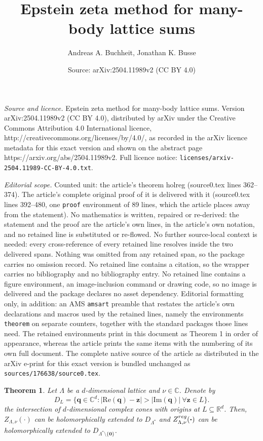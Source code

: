 \documentclass[10pt,a4paper]{amsart}
\title{Epstein zeta method for many-body lattice sums}
\author{Andreas A. Buchheit, Jonathan K. Busse}
\date{Source: arXiv:2504.11989v2 (CC BY 4.0)}
\newtheorem{theorem}{Theorem}
\renewcommand{\Im}[1]{\mathrm{Im}(#1)}
\renewcommand{\Re}[1]{\mathrm{Re}(#1)}
\begin{document}
\maketitle

\noindent\emph{Source and licence.} Epstein zeta method for many-body lattice sums. Version arXiv:2504.11989v2 (CC BY 4.0), distributed by arXiv under the Creative Commons Attribution 4.0 International licence, http://creativecommons.org/licenses/by/4.0/, as recorded in the arXiv licence metadata for this exact version and shown on the abstract page https://arxiv.org/abs/2504.11989v2. Full licence notice: \texttt{licenses/arxiv-2504.11989-CC-BY-4.0.txt}.\par\smallskip

\noindent\textit{Editorial scope.} Counted unit: the article's theorem holreg (source0.tex lines 362--374). The article's complete original proof of it is delivered with it (source0.tex lines 392--480, one \texttt{proof} environment of 89 lines, which the article places away from the statement). No mathematics is written, repaired or re-derived: the statement and the proof are the article's own lines, in the article's own notation, and no retained line is substituted or re-flowed.  No further source-local context is needed: every cross-reference of every retained line resolves inside the two delivered spans.  Nothing was omitted from any retained span, so the package carries no omission record.  No retained line contains a citation, so the wrapper carries no bibliography and no bibliography entry.  No retained line contains a figure environment, an image-inclusion command or drawing code, so no image is delivered and the package declares no asset dependency.  Editorial formatting only, in addition: an AMS \texttt{amsart} preamble that restates the article's own declarations and macros used by the retained lines, namely the environments \texttt{theorem} on separate counters, together with the standard packages those lines need.  The retained environments print in this document as Theorem 1 in order of appearance, whereas the article prints the same items with the numbering of its own full document.  The complete native source of the article as distributed in the arXiv e-print for this exact version is bundled unchanged as \texttt{sources/176638/source0.tex}.
\begin{theorem}
\label{holreg}
Let $\Lambda$ be a $d$-dimensional lattice and $\nu\in\mathds C$. 
Denote by 
$$
D_L=\{\bm q\in\mathds C^d:|\Re{\bm q}-\bm z|>|\Im{\bm q}|\ \forall \bm z\in L\}.
$$
the intersection of $d$-dimensional complex cones with origins at $L\subseteq \mathds R^d$.
Then, $Z_{\Lambda,\nu}(\bm \cdot)$ can be holomorphically extended to $D_{\Lambda^\ast}$
and $Z^{\rm reg}_{\Lambda,\nu}(\bm \cdot)$ 
can be holomorphically extended to 
$D_{\Lambda^*\setminus\{\bm 0\}}$.
\end{theorem}
\end{document}
